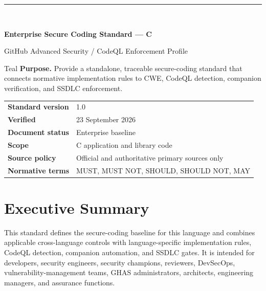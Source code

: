 \documentclass[10pt,letterpaper]{article}
\begin{document}
\fancyhead[L]{\textcolor{Muted}{Enterprise Secure Coding Standard --- C}}
\fancyhead[R]{\textcolor{Muted}{v1.0 --- 23 September 2026}}
\hypersetup{pageanchor=false}
\begin{titlepage}
\thispagestyle{empty}
\vspace*{0.85in}
{\color{Teal}\rule{1.2in}{3pt}}\\[0.32in]
{\Huge\bfseries\color{Navy}Enterprise Secure Coding Standard --- C\par}
\vspace{0.18in}
{\Large\color{Teal}GitHub Advanced Security / CodeQL Enforcement Profile\par}
\vspace{0.55in}
\begin{callout}{Teal}
\textbf{Purpose.} Provide a standalone, traceable secure-coding standard that connects normative implementation rules to CWE, CodeQL detection, companion verification, and SSDLC enforcement.
\end{callout}
\vfill
\begin{tabular}{@{}ll@{}}
\textbf{Standard version} & 1.0 \\
\textbf{Verified} & 23 September 2026 \\
\textbf{Document status} & Enterprise baseline \\
\textbf{Scope} & C application and library code \\
\textbf{Source policy} & Official and authoritative primary sources only \\
\textbf{Normative terms} & MUST, MUST NOT, SHOULD, SHOULD NOT, MAY \\
\end{tabular}
\vspace{0.55in}
\end{titlepage}
\hypersetup{pageanchor=true}
\tableofcontents
\clearpage
{}

\section{Executive Summary}
This standard defines the secure-coding baseline for this language and combines applicable cross-language controls with language-specific implementation rules, CodeQL detection, companion automation, and SSDLC gates. It is intended for developers, security engineers, security champions, reviewers, DevSecOps, vulnerability-management teams, GHAS administrators, architects, engineering managers, and assurance functions.
\end{document}
